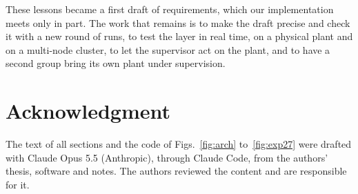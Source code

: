 \documentclass[conference]{IEEEtran}
\begin{document}
These lessons became a first draft of requirements, which our implementation meets only in part. The work that remains is to make the draft precise and check it with a new round of runs, to test the layer in real time, on a physical plant and on a multi-node cluster, to let the supervisor act on the plant, and to have a second group bring its own plant under supervision.

\section*{Acknowledgment}

The text of all sections and the code of Figs.~\ref{fig:arch} to~\ref{fig:exp27} were drafted with Claude Opus 5.5 (Anthropic), through Claude Code, from the authors' thesis, software and notes. The authors reviewed the content and are responsible for it.



\end{document}
